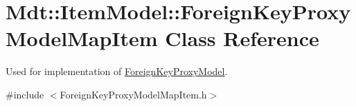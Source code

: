 \hypertarget{class_mdt_1_1_item_model_1_1_foreign_key_proxy_model_map_item}{}\section{Mdt\+:\+:Item\+Model\+:\+:Foreign\+Key\+Proxy\+Model\+Map\+Item Class Reference}
\label{class_mdt_1_1_item_model_1_1_foreign_key_proxy_model_map_item}


Used for implementation of \hyperlink{class_mdt_1_1_item_model_1_1_foreign_key_proxy_model}{Foreign\+Key\+Proxy\+Model}.  




{\ttfamily \#include $<$Foreign\+Key\+Proxy\+Model\+Map\+Item.\+h$>$}

